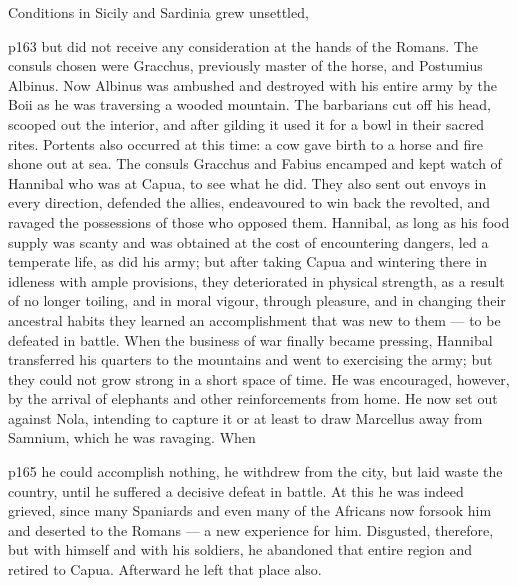 Conditions in Sicily and Sardinia grew unsettled,

p163 but did not receive any consideration at the hands of the Romans. The consuls chosen were Gracchus, previously master of the horse, and Postumius Albinus. Now Albinus was ambushed and destroyed with his entire army by the Boii as he was traversing a wooded mountain. The barbarians cut off his head, scooped out the interior, and after gilding it used it for a bowl in their sacred rites. Portents also occurred at this time: a cow gave birth to a horse and fire shone out at sea. The consuls Gracchus and Fabius encamped and kept watch of Hannibal who was at Capua, to see what he did. They also sent out envoys in every direction, defended the allies, endeavoured to win back the revolted, and ravaged the possessions of those who opposed them. Hannibal, as long as his food supply was scanty and was obtained at the cost of encountering dangers, led a temperate life, as did his army; but after taking Capua and wintering there in idleness with ample provisions, they deteriorated in physical strength, as a result of no longer toiling, and in moral vigour, through pleasure, and in changing their ancestral habits they learned an accomplishment that was new to them \texthebrew{—} to be defeated in battle. When the business of war finally became pressing, Hannibal transferred his quarters to the mountains and went to exercising the army; but they could not grow strong in a short space of time. He was encouraged, however, by the arrival of elephants and other reinforcements from home. He now set out against Nola, intending to capture it or at least to draw Marcellus away from Samnium, which he was ravaging. When

p165 he could accomplish nothing, he withdrew from the city, but laid waste the country, until he suffered a decisive defeat in battle. At this he was indeed grieved, since many Spaniards and even many of the Africans now forsook him and deserted to the Romans \texthebrew{—} a new experience for him. Disgusted, therefore, but with himself and with his soldiers, he abandoned that entire region and retired to Capua. Afterward he left that place also.

